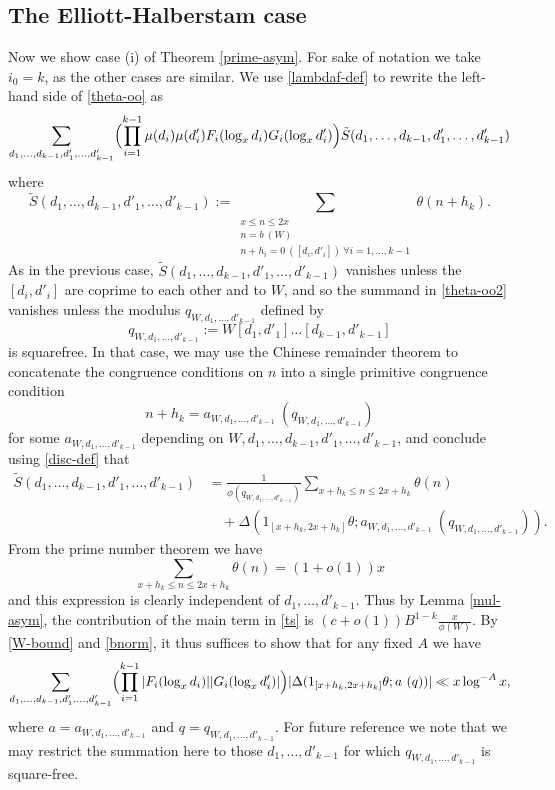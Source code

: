 \subsection{The Elliott-Halberstam case}\label{eh-case}

Now we show case (i) of Theorem \ref{prime-asym}.  For sake of notation we take $i_0=k$, as the other cases are similar.  We use \eqref{lambdaf-def} to rewrite the left-hand side of \eqref{theta-oo} as
\begin{equation}\label{theta-oo2}
 \sum_{d_1,\dots,d_{k-1},d'_1,\dots,d'_{k-1}} \Bigl(\prod_{i=1}^{k-1} \mu(d_i) \mu(d'_i) F_i(\log_x d_i) G_i(\log_x d'_i)\Bigr) \tilde S(d_1,\dots,d_{k-1},d'_1,\dots,d'_{k-1})
\end{equation}
where
$$ \tilde S(d_1,\dots,d_{k-1},d'_1,\dots,d'_{k-1}) := 
 \sum_{\substack{x \leq n \leq 2x\\ n = b\ (W) \\ n + h_i = 0\ ([d_i,d'_i])\ \forall i=1,\dots,k-1}} \theta(n+h_k).
$$
As in the previous case, $\tilde S(d_1,\dots,d_{k-1},d'_1,\dots,d'_{k-1})$ vanishes unless the $[d_i,d'_i]$ are coprime to each other and to $W$, and so the summand in \eqref{theta-oo2} vanishes unless the modulus $q_{W,d_1,\dots,d'_{k-1}}$ defined by
\begin{equation}\label{q-def}
q_{W,d_1,\dots,d'_{k-1}} := W [d_1,d'_1] \dots [d_{k-1},d'_{k-1}]
\end{equation}
is squarefree.  In that case, we may use the Chinese remainder theorem to concatenate the congruence conditions  on $n$ into a single primitive congruence condition  
$$n+h_k = a_{W,d_1,\dots,d'_{k-1}} \ (q_{W,d_1,\dots,d'_{k-1}})$$
for some $a_{W,d_1,\dots,d'_{k-1}}$ depending on $W, d_1,\dots,d_{k-1},d'_1,\dots,d'_{k-1}$, and conclude using \eqref{disc-def} that
\begin{equation}\label{ts}
\begin{split}
 \tilde S(d_1,\dots,d_{k-1},d'_1,\dots,d'_{k-1}) &= \frac{1}{\phi(q_{W,d_1,\dots,d'_{k-1}})} \sum_{x+h_k \leq n \leq 2x+h_k} \theta(n)\\
&\quad + \Delta( 1_{[x+h_k,2x+h_k]} \theta;  a_{W,d_1,\dots,d'_{k-1}}\ (q_{W,d_1,\dots,d'_{k-1}})).
\end{split}
\end{equation}
From the prime number theorem we have
$$ \sum_{x+h_k \leq n \leq 2x+h_k} \theta(n) = (1+o(1)) x$$
and this expression is clearly independent of $d_1,\dots,d'_{k-1}$.  Thus by Lemma \ref{mul-asym}, the contribution of the main term in \eqref{ts} is $(c+o(1)) B^{1-k} \frac{x}{\phi(W)}$.  By \eqref{W-bound} and \eqref{bnorm}, it thus suffices to show that for any fixed $A$ we have
\begin{equation}\label{sosmall}
 \sum_{d_1,\dots,d_{k-1},d'_1,\dots,d'_{k-1}} \Bigl(\prod_{i=1}^{k-1} |F_i(\log_x d_i)| |G_i(\log_x d'_i)|\Bigr) 
|\Delta( 1_{[x+h_k,2x+h_k]} \theta;  a\ (q))| \ll x \log^{-A} x,
\end{equation}
where $a=a_{W,d_1,\dots,d'_{k-1}}$ and $q=q_{W,d_1,\dots,d'_{k-1}}$.  For future reference we note that we may restrict the summation here to those $d_1,\dots,d'_{k-1}$ for which $q_{W,d_1,\dots,d'_{k-1}}$ is square-free.

